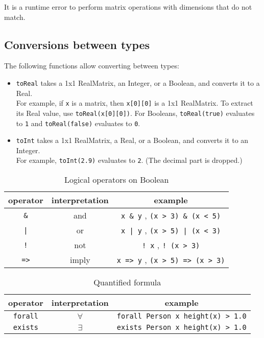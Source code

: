 It is a runtime error to perform matrix operations with dimensions that do not
match.


\subsection{Conversions between types}
\label{sec:builtin-conversions}

The following functions allow converting between types:

\begin{itemize}
\item
    \verb|toReal| takes a 1x1 RealMatrix, an Integer, or a Boolean, and
    converts it to a Real. \\
    For example, if \verb|x| is a matrix, then \verb|x[0][0]| is a 1x1
    RealMatrix. To extract its Real value, use \verb|toReal(x[0][0])|.
    For Booleans, \verb|toReal(true)| evaluates to \verb|1| and
    \verb|toReal(false)| evaluates to \verb|0|.
\item
    \verb|toInt| takes a 1x1 RealMatrix, a Real, or a Boolean, and converts it
    to an Integer. \\
    For example, \verb|toInt(2.9)| evaluates to \verb|2|. (The decimal part is
    dropped.)
\end{itemize}



\begin{table}[H]
\centering
\caption{Logical operators on Boolean}
\begin{tabular}{ c c c }
\toprule 
operator & interpretation & example \\
\midrule
\verb|&| & and & \verb|x & y| , \verb|(x > 3) & (x < 5)| \\ 
{\tt |} & or & \verb#x | y# , \verb#(x > 5) | (x < 3)# \\ 
{\tt !} & not & \verb|! x| , \verb|! (x > 3)| \\
{\tt =>} & imply & \verb|x => y| , \verb|(x > 5) => (x > 3)| \\
\bottomrule
\end{tabular}
\end{table}

\begin{table}[H]
\centering
\caption{Quantified formula}
\begin{tabular}{ c c c }
\toprule 
operator & interpretation & example \\
\midrule
{\tt forall} & $\forall$ & \verb|forall Person x height(x) > 1.0| \\ 
{\tt exists} & $\exists$ & \verb|exists Person x height(x) > 1.0|  \\ 
\bottomrule
\end{tabular}
\end{table}

